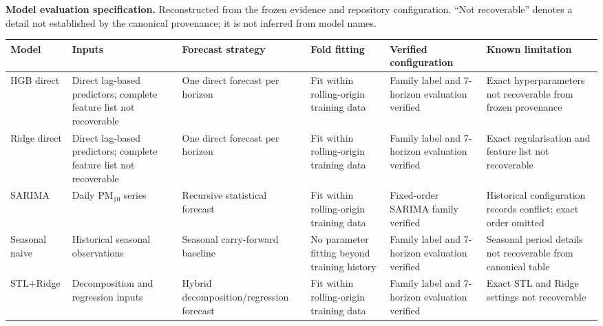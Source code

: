 \begin{table}[ht]
\centering
\scriptsize
\setlength{\tabcolsep}{2pt}
\textbf{Model evaluation specification.} Reconstructed from the frozen evidence and repository configuration. ``Not recoverable'' denotes a detail not established by the canonical provenance; it is not inferred from model names.\par\smallskip
\begin{tabular}{@{}p{2.15cm}p{2.25cm}p{2.25cm}p{2.05cm}p{2.25cm}p{2.45cm}@{}}
\toprule
Model & Inputs & Forecast strategy & Fold fitting & Verified configuration & Known limitation \\
\midrule
HGB direct & Direct lag-based predictors; complete feature list not recoverable & One direct forecast per horizon & Fit within rolling-origin training data & Family label and 7-horizon evaluation verified & Exact hyperparameters not recoverable from frozen provenance \\
Ridge direct & Direct lag-based predictors; complete feature list not recoverable & One direct forecast per horizon & Fit within rolling-origin training data & Family label and 7-horizon evaluation verified & Exact regularisation and feature list not recoverable \\
SARIMA & Daily PM$_{10}$ series & Recursive statistical forecast & Fit within rolling-origin training data & Fixed-order SARIMA family verified & Historical configuration records conflict; exact order omitted \\
Seasonal naive & Historical seasonal observations & Seasonal carry-forward baseline & No parameter fitting beyond training history & Family label and 7-horizon evaluation verified & Seasonal period details not recoverable from canonical table \\
STL+Ridge & Decomposition and regression inputs & Hybrid decomposition/regression forecast & Fit within rolling-origin training data & Family label and 7-horizon evaluation verified & Exact STL and Ridge settings not recoverable \\
\bottomrule
\end{tabular}
\end{table}
